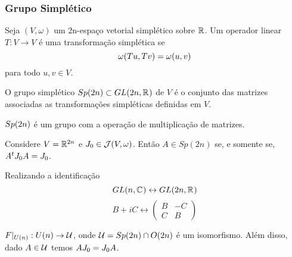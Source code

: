 \documentclass{beamer}
\begin{document}
	\begin{frame}
		\frametitle{Grupo Simplético}
		
		\begin{definicao}
			Seja $(V, \omega)$ um 2n-espaço vetorial simplético sobre $\mathbb{R}^{}$. Um operador linear $T: V \to V$ é uma transformação simplética se 
			$$
			\omega(Tu, Tv) = \omega(u, v)
			$$ para todo $u,v\in V$.
		\end{definicao}
		
		\begin{definicao}
			O grupo simplético $Sp(2n) \subset GL(2n, \mathbb{R}^{})$ de $V$ é o conjunto das matrizes associadas as transformações simpléticas definidas em $V$.
		\end{definicao}	
		
	\end{frame}
	
	\begin{frame}
		\begin{proposicao}
			$Sp(2n)$ é um grupo com a operação de multiplicação de matrizes.
		\end{proposicao}
		
		\begin{lema}[Caracterização de $Sp(2n)$]
			 Considere $V = \mathbb{R}^{2n}$ e $J_{0} \in \mathcal{J}(V, \omega)$. Então $A\in Sp(2n)$ se, e somente se, $A^{t}J_{0} A = J_{0}$.
		\end{lema}
	\end{frame}
	
	\begin{frame}
		Realizando a identificação
		$$
		GL(n, \mathbb{C}^{})\leftrightarrow GL(2n, \mathbb{R}^{})
		$$
		$$
		B+iC \leftrightarrow
		\left(
		\begin{array}{cc}
		B & -C
		\\
		C & B
		\end{array}
		\right)
		$$  
		\begin{lema}
			$F|_{U(n)}: U(n) \to \mathcal{U} $, onde $\mathcal{U}  = Sp(2n)\cap O(2n)$ é um isomorfismo. Além disso, dado $A \in \mathcal{U} $ temos $AJ_{0}=J_{0} A$.
		\end{lema}
	\end{frame}
		
\end{document}
